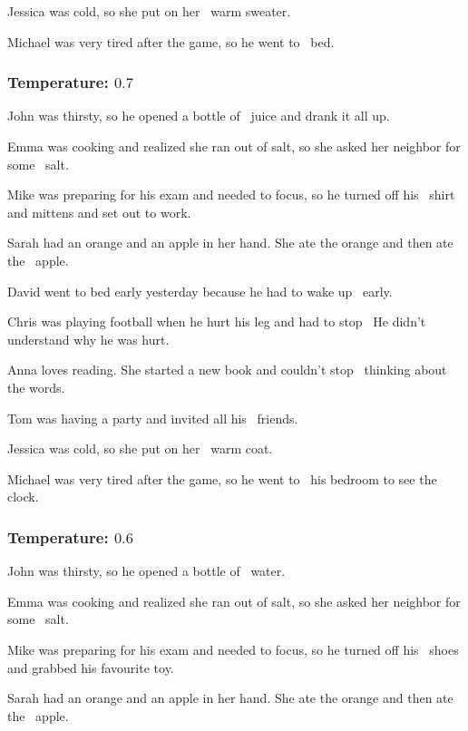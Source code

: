 \documentclass[11pt]{article}
\begin{document}
    Jessica was cold, so she put on her \textellipsis\ warm sweater.

    Michael was very tired after the game, so he went to \textellipsis\ bed.

    \subsubsection*{Temperature: $0.7$}

    John was thirsty, so he opened a bottle of \textellipsis\ juice and drank it all up.

    Emma was cooking and realized she ran out of salt, so she asked her neighbor for some \textellipsis\ salt.

    Mike was preparing for his exam and needed to focus, so he turned off his \textellipsis\ shirt and mittens and set out to work.

    Sarah had an orange and an apple in her hand. She ate the orange and then ate the \textellipsis\ apple.

    David went to bed early yesterday because he had to wake up \textellipsis\ early.

    Chris was playing football when he hurt his leg and had to stop \textellipsis\  He didn't understand why he was hurt.

    Anna loves reading. She started a new book and couldn't stop \textellipsis\ thinking about the words.

    Tom was having a party and invited all his \textellipsis\ friends.

    Jessica was cold, so she put on her \textellipsis\ warm coat.

    Michael was very tired after the game, so he went to \textellipsis\ his bedroom to see the clock.

    \subsubsection*{Temperature: $0.6$}

    John was thirsty, so he opened a bottle of \textellipsis\ water.

    Emma was cooking and realized she ran out of salt, so she asked her neighbor for some \textellipsis\ salt.

    Mike was preparing for his exam and needed to focus, so he turned off his \textellipsis\ shoes and grabbed his favourite toy.

    Sarah had an orange and an apple in her hand. She ate the orange and then ate the \textellipsis\ apple.
\end{document}
